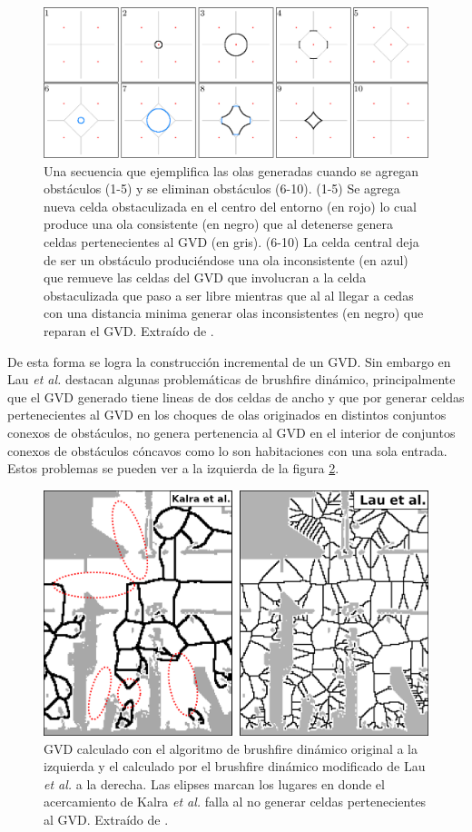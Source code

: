 \begin{figure}[H]
  \center
  \includegraphics[width=1\linewidth]{imagenes/wavesKalra.png}
  \caption{Una secuencia que ejemplifica las olas generadas cuando se agregan obstáculos (1-5) y se eliminan obstáculos (6-10). (1-5) Se agrega nueva celda obstaculizada en el centro del entorno (en rojo) lo cual produce una ola consistente (en negro) que al detenerse genera celdas pertenecientes al GVD (en gris). (6-10) La celda central deja de ser un obstáculo produciéndose una ola inconsistente (en azul) que remueve las celdas del GVD que involucran a la celda obstaculizada que paso a ser libre mientras que al al llegar a cedas con una distancia minima generar olas inconsistentes (en negro) que reparan el GVD. Extraído de \cite{kalra2009incremental}.}\label{fig:ejWavesIncKarlra}
\end{figure} 


De esta forma se logra la construcción incremental de un GVD. Sin embargo en \cite{Lau2013} Lau \textit{et al.} destacan algunas problemáticas de brushfire dinámico, principalmente que el GVD generado tiene lineas de dos celdas de ancho y que por generar celdas pertenecientes al GVD en los choques de olas originados en distintos conjuntos conexos de obstáculos, no genera pertenencia al GVD en el interior de conjuntos conexos de obstáculos cóncavos como lo son habitaciones con una sola entrada. Estos problemas se pueden ver a la izquierda de la figura \ref{fig:lauPalo}.
\begin{figure}[H]
  \center
  \includegraphics[width=0.75\linewidth]{imagenes/lauPalo.png}
  \caption{GVD calculado con el algoritmo de brushfire dinámico original a la izquierda y el calculado por el brushfire dinámico modificado de Lau \textit{et al.} a la derecha. Las elipses marcan los lugares en donde el acercamiento de Kalra \textit{et al.} falla al no generar celdas pertenecientes al GVD. Extraído de \cite{Lau2013}.}\label{fig:lauPalo}
\end{figure} 

